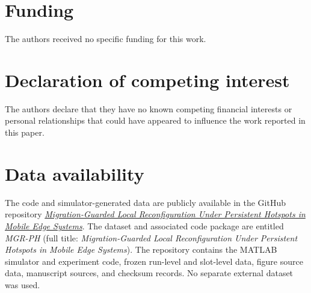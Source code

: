 \documentclass[preprint,12pt]{elsarticle}
\begin{document}
\section*{Funding}
The authors received no specific funding for this work.
\section*{Declaration of competing interest}
The authors declare that they have no known competing financial interests or
personal relationships that could have appeared to influence the work
reported in this paper.
\section*{Data availability}
The code and simulator-generated data are publicly available in the GitHub
repository \href{https://github.com/dpy3/Migration-Guarded-Local-Reconfiguration-Under-Persistent-Hotspots-in-Mobile-Edge-Systems}{\emph{Migration-Guarded Local Reconfiguration Under Persistent Hotspots in Mobile Edge Systems}}.
The dataset and associated code package are entitled \emph{MGR-PH}
(full title: \emph{Migration-Guarded Local
Reconfiguration Under Persistent Hotspots in Mobile Edge Systems}). The
repository contains the MATLAB simulator and experiment code,
frozen run-level and slot-level data, figure source data, manuscript sources,
and checksum records. No separate external dataset was used.


\end{document}
